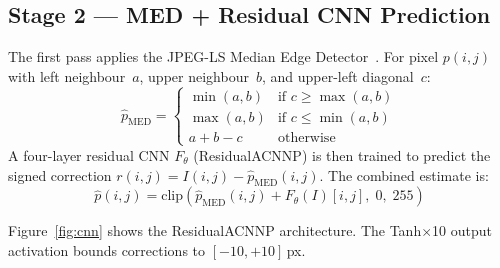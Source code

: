 \documentclass[runningheads]{llncs}
\begin{document}
\subsection{Stage 2 — MED + Residual CNN Prediction}
The first pass applies the JPEG-LS Median Edge Detector~\cite{ref3}.
For pixel $p(i,j)$ with left neighbour~$a$, upper
neighbour~$b$, and upper-left diagonal~$c$:
\begin{equation}
\hat{p}_\mathrm{MED} =
\begin{cases}
\min(a,b) & \text{if } c \ge \max(a,b)\\
\max(a,b) & \text{if } c \le \min(a,b)\\
a+b-c     & \text{otherwise}
\end{cases}
\label{eq:med}
\end{equation}
A four-layer residual CNN $F_\theta$ (ResidualACNNP) is
then trained to predict the signed correction
$r(i,j)=I(i,j)-\hat{p}_\mathrm{MED}(i,j)$. The combined
estimate is:
\begin{equation}
\hat{p}(i,j) = \mathrm{clip}\!\left(\hat{p}_\mathrm{MED}(i,j)+F_\theta(I)[i,j],\;0,\;255\right)
\label{eq:cnn}
\end{equation}

Figure~\ref{fig:cnn} shows the ResidualACNNP architecture.
The Tanh$\times$10 output activation bounds corrections
to $[-10,+10]$\,px.
\end{document}
